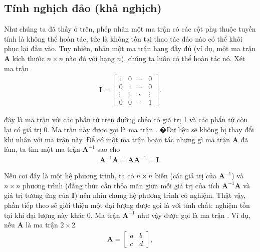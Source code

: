 \documentclass[letterpaper,11pt,english]{sphinxmanual}
\begin{document}
\subsection{Tính nghịch đảo (khả nghịch)}
\label{\detokenize{chapter_appendix_math/geometry-linear-algebric-ops_vn:tinh-nghich-dao-kha-nghich}}


Như chúng ta đã thấy ở trên, phép nhân một ma trận có các cột phụ thuộc
tuyến tính là không thể hoàn tác, tức là không tồn tại thao tác đảo nào
có thể khôi phục lại đầu vào. Tuy nhiên, nhân một ma trận hạng đầy đủ
(ví dụ, một ma trận \(\mathbf{A}\) kích thước \(n \times n\) nào
đó với hạng \(n\)), chúng ta luôn có thể hoàn tác nó. Xét ma trận
\begin{equation}\label{equation:chapter_appendix_math/geometry-linear-algebric-ops_vn:chapter_appendix_math/geometry-linear-algebric-ops_vn:18}
\begin{split}\mathbf{I} = \begin{bmatrix}
1 & 0 & \cdots & 0 \\
0 & 1 & \cdots & 0 \\
\vdots & \vdots & \ddots & \vdots \\
0 & 0 & \cdots & 1
\end{bmatrix}.\end{split}
\end{equation}


đây là ma trận với các phần tử trên đường chéo có giá trị 1 và các phẩn
tử còn lại có giá trị 0. Ma trận này được gọi là ma trận . �Dữ
liệu sẽ không bị thay đổi khi nhân với ma trận này. Để có một ma trận
hoàn tác những gì ma trận \(\mathbf{A}\) đã làm, ta tìm một ma trận
\(\mathbf{A}^{-1}\) sao cho
\begin{equation}\label{equation:chapter_appendix_math/geometry-linear-algebric-ops_vn:chapter_appendix_math/geometry-linear-algebric-ops_vn:19}
\begin{split}\mathbf{A}^{-1}\mathbf{A} = \mathbf{A}\mathbf{A}^{-1} =  \mathbf{I}.\end{split}
\end{equation}


Nếu coi đây là một hệ phương trình, ta có \(n \times n\) biến (các
giá trị của \(\mathbf{A}^{-1}\)) và \(n \times n\) phương trình
(đẳng thức cần thỏa mãn giữa mỗi giá trị của tích
\(\mathbf{A}^{-1}\mathbf{A}\) và giá trị tương ứng của
\(\mathbf{I}\)) nên nhìn chung hệ phương trình có nghiệm. Thật vậy,
phần tiếp theo sẽ giới thiệu một đại lượng được gọi là  với
tính chất: nghiệm tồn tại khi đại lượng này khác 0. Ma trận
\(\mathbf{A}^{-1}\) như vậy được gọi là ma trận . Ví dụ,
nếu \(\mathbf{A}\) là ma trận \(2 \times 2\)
\begin{equation}\label{equation:chapter_appendix_math/geometry-linear-algebric-ops_vn:chapter_appendix_math/geometry-linear-algebric-ops_vn:20}
\begin{split}\mathbf{A} = \begin{bmatrix}
a & b \\
c & d
\end{bmatrix},\end{split}
\end{equation}
\end{document}
